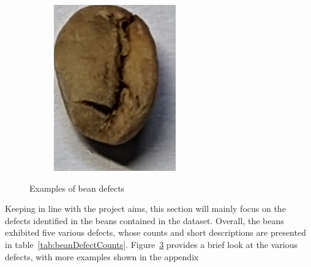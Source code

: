 \begin{figure}[h]
\begin{subfigure}
{		}
		 \label{fig:moldBeanSingle}
	\end{subfigure}
	\begin{subfigure}
	{0.25\textwidth}
		\includegraphics[height=0.8\linewidth, keepaspectratio]{
			./figures/methodology/under-bean
		}
		 \label{fig:underBeanSingle}
	\end{subfigure}
	\caption{Examples of bean defects}
	\label{fig:beanDefects}
\end{figure}

Keeping in line with the project
aims, this section will mainly focus on the defects identified in the beans
contained in the dataset.
Overall, the beans exhibited five various defects, whose
counts and short descriptions are presented in table~\ref{tab:beanDefectCounts}.
Figure~\ref{fig:beanDefects} provides a brief look at the various defects, with more
examples shown in the appendix %

